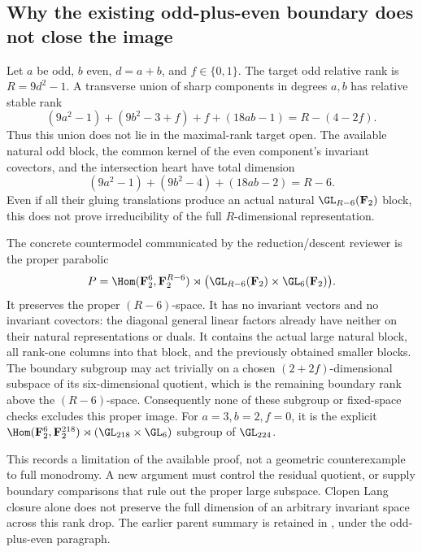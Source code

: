 \subsection*{Why the existing odd-plus-even boundary does not close the image}
Let $a$ be odd, $b$ even, $d=a+b$, and $f\in\{0,1\}$.
The target odd relative rank is $R=9d^2-1$. A transverse union of
sharp components in degrees $a,b$ has relative stable rank
\[
 (9a^2-1)+(9b^2-3+f)+f+(18ab-1)
       =R-(4-2f).
\]
Thus this union does not lie in the maximal-rank target open.
The available natural odd block, the common kernel of the even
component's invariant covectors, and the intersection heart have
total dimension
\[
 (9a^2-1)+(9b^2-4)+(18ab-2)=R-6.
\]
Even if all their gluing translations produce an actual natural
$\GL_{R-6}(\mathbf F_2)$ block, this does not prove irreducibility
of the full $R$-dimensional representation.

The concrete countermodel communicated by the reduction/descent
reviewer is the proper parabolic
\[
 P=\Hom(\mathbf F_2^6,\mathbf F_2^{R-6})
       \rtimes\bigl(\GL_{R-6}(\mathbf F_2)
                      \times\GL_6(\mathbf F_2)\bigr).
\]
It preserves the proper $(R-6)$-space. It has no invariant vectors
and no invariant covectors: the diagonal general linear factors
already have neither on their natural representations or duals.
It contains the actual large natural block, all rank-one columns
into that block, and the previously obtained smaller blocks.
The boundary subgroup may act trivially on a chosen
$(2+2f)$-dimensional subspace of its six-dimensional quotient,
which is the remaining boundary rank above the $(R-6)$-space.
Consequently none of these subgroup or fixed-space checks excludes
this proper image. For $a=3,b=2,f=0$, it is the explicit
$\Hom(\mathbf F_2^6,\mathbf F_2^{218})\rtimes
(\GL_{218}\times\GL_6)$ subgroup of $\GL_{224}$.

This records a limitation of the available proof, not a geometric
counterexample to full monodromy. A new argument must control the
residual quotient, or supply boundary comparisons that rule out the
proper large subspace. Clopen Lang closure alone does not preserve
the full dimension of an arbitrary invariant space across this
rank drop. The earlier parent summary is retained in
, under the odd-plus-even paragraph.
